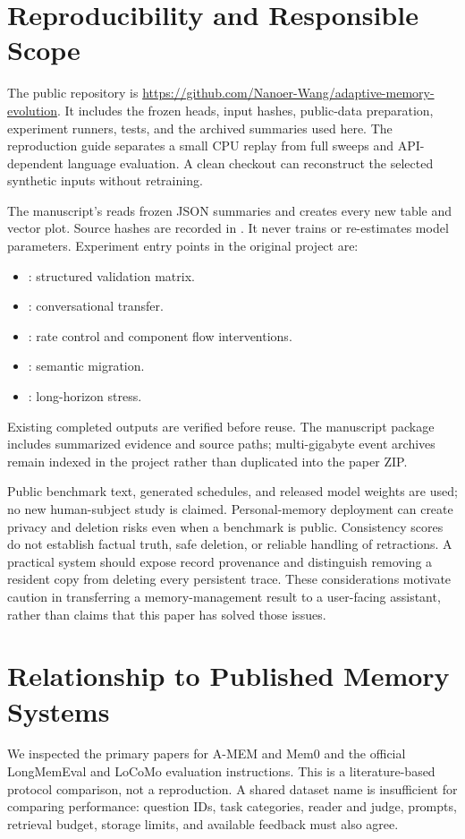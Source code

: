 \section{Reproducibility and Responsible Scope}
The public repository is \url{https://github.com/Nanoer-Wang/adaptive-memory-evolution}.
It includes the frozen heads, input hashes, public-data preparation, experiment runners, tests, and the archived summaries used here. The reproduction guide separates a small CPU replay from full sweeps and API-dependent language evaluation. A clean checkout can reconstruct the selected synthetic inputs without retraining.

The manuscript's  reads frozen JSON summaries and creates every new table and vector plot. Source hashes are recorded in . It never trains or re-estimates model parameters. Experiment entry points in the original project are:
\begin{itemize}
\item {}: structured validation matrix.
\item {}: conversational transfer.
\item {}: rate control and component flow interventions.
\item {}: semantic migration.
\item {}: long-horizon stress.
\end{itemize}
Existing completed outputs are verified before reuse. The manuscript package includes summarized evidence and source paths; multi-gigabyte event archives remain indexed in the project rather than duplicated into the paper ZIP.

Public benchmark text, generated schedules, and released model weights are used; no new human-subject study is claimed. Personal-memory deployment can create privacy and deletion risks even when a benchmark is public. Consistency scores do not establish factual truth, safe deletion, or reliable handling of retractions. A practical system should expose record provenance and distinguish removing a resident copy from deleting every persistent trace. These considerations motivate caution in transferring a memory-management result to a user-facing assistant, rather than claims that this paper has solved those issues.

\clearpage
\section{Relationship to Published Memory Systems}\label{app:external}
We inspected the primary papers for A-MEM and Mem0 and the official LongMemEval and LoCoMo evaluation instructions. This is a literature-based protocol comparison, not a reproduction. A shared dataset name is insufficient for comparing performance: question IDs, task categories, reader and judge, prompts, retrieval budget, storage limits, and available feedback must also agree.

